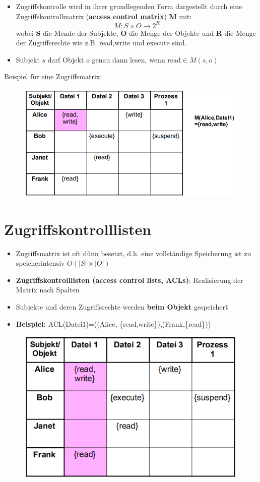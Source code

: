 \documentclass[openany]{book}
\begin{document}
\begin{itemize}
\item Zugriffskontrolle wird in ihrer grundlegenden Form dargestellt durch eine Zugriffskontrollmatrix (\textbf{access control matrix}) \textbf{M} mit: $$M:S\times O\rightarrow 2^R$$ wobei \textbf{S} die Mende der Subjekte, \textbf{O} die Menge der Objekte und \textbf{R} die Menge der Zugriffsrechte wie z.B. read,write und execute sind.
\item Subjekt $s$ darf Objekt $o$ genau dann lesen, wenn $\text{read}\in M(s,o)$
\end{itemize}

Beispiel für eine Zugriffsmatrix:

\begin{figure}[h!]
\centering
\includegraphics[width=0.85\linewidth]{Pics/AccessMatrix.PNG}
\end{figure}

\section{Zugriffskontrolllisten}

\begin{itemize}
\item Zugriffsmatrix ist oft dünn besetzt, d.h. eine vollständige Speicherung ist zu speicherintensiv $O(|S|\times |O|)$
\item \textbf{Zugriffskontrolllisten (access control lists, ACLs)}: Realisierung der Matrix nach Spalten
\item Subjekte und deren Zugriffsrechte werden \textbf{beim Objekt} gespeichert
\item \textbf{Beispiel:} ACL(Datei1)=((Alice, \{read,write\}),(Frank,\{read\}))
\end{itemize}

\begin{figure}[h!]
\centering
\includegraphics[width=0.7\linewidth]{Pics/AccessControlLists.PNG}
\end{figure}
\end{document}
